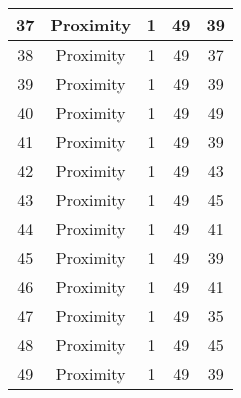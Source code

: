 \documentclass[results.tex]{subfiles}
\begin{document}
\begin{center}
\begin{tabular}{| c || c | c | c | c |}
            \hline
            37                      & Proximity                    & 1                      & 49                      & 39                   \\
            \hline
            38                      & Proximity                    & 1                      & 49                      & 37                   \\
            \hline
            39                      & Proximity                    & 1                      & 49                      & 39                   \\
            \hline
            40                      & Proximity                    & 1                      & 49                      & 49                   \\
            \hline
            41                      & Proximity                    & 1                      & 49                      & 39                   \\
            \hline
            42                      & Proximity                    & 1                      & 49                      & 43                   \\
            \hline
            43                      & Proximity                    & 1                      & 49                      & 45                   \\
            \hline
            44                      & Proximity                    & 1                      & 49                      & 41                   \\
            \hline
            45                      & Proximity                    & 1                      & 49                      & 39                   \\
            \hline
            46                      & Proximity                    & 1                      & 49                      & 41                   \\
            \hline
            47                      & Proximity                    & 1                      & 49                      & 35                   \\
            \hline
            48                      & Proximity                    & 1                      & 49                      & 45                   \\
            \hline
            49                      & Proximity                    & 1                      & 49                      & 39                   \\
            \hline
        \end{tabular}
    \end{center}
\end{document}
